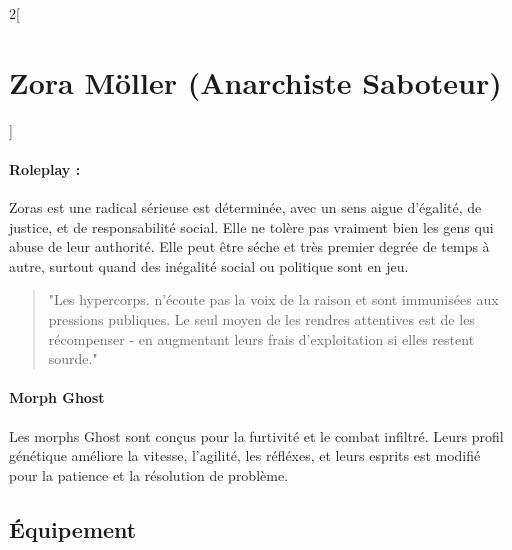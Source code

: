 \documentclass[a4paper,9pt]{article}
\begin{document}
\begin{multicols}{2}[\section*{Zora Möller (Anarchiste Saboteur)}]
   \paragraph{Roleplay :} Zoras est une radical sérieuse est déterminée, avec un sens aigue
   d'égalité, de justice, et de responsabilité social.
   Elle ne tolère pas vraiment bien les gens qui abuse de leur authorité.
   Elle peut être séche et très premier degrée de temps à autre, surtout quand des
   inégalité social ou politique sont en jeu.

   \begin{quote}
   "Les hypercorps. n'écoute pas la voix de la raison et sont immunisées aux
   pressions publiques. Le seul moyen de les rendres attentives est de les
   récompenser - en augmentant leurs frais d'exploitation si elles restent sourde."
\end{quote}

   \paragraph{Morph Ghost}
   Les morphs Ghost sont conçus pour la furtivité et le combat infiltré.
   Leurs profil génétique améliore la vitesse, l'agilité, les réfléxes, et
   leurs esprits est modifié pour la patience et la résolution de problème.

   \subsection*{Équipement}


\end{multicols}
\end{document}
